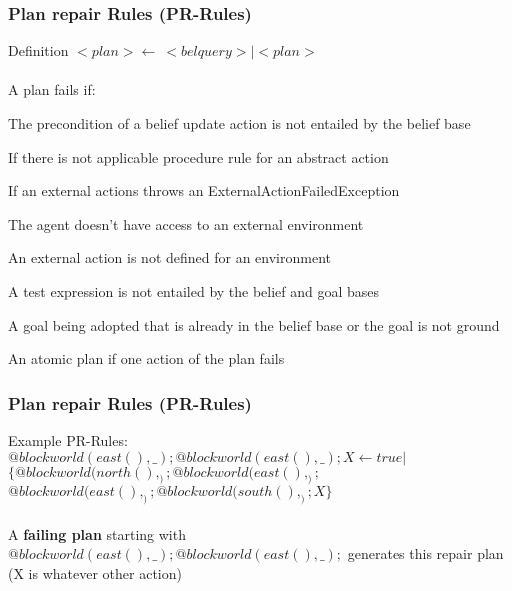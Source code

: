   \begin{frame}
    \frametitle{Plan repair Rules (PR-Rules)}
    \begin{block}{Definition}
      $<plan>\leftarrow\ <belquery> | <plan> $ \\~\\

      A plan fails if:
      \begin{itemize}{\small
        \item The precondition of a belief update action is not entailed by the belief base
        \item If there is not applicable procedure rule for an abstract action
        \item If an external actions throws an ExternalActionFailedException
        \item The agent doesn't have access to an external environment 
        \item An external action is not defined for an environment
        \item A test expression is not entailed by the belief and goal bases
        \item A goal being adopted that is already in the belief base or the goal is not ground
        \item An atomic plan if one action of the plan fails}
      \end{itemize} 
    \end{block}
  \end{frame}
  
  \begin{frame}
    \frametitle{Plan repair Rules (PR-Rules)}
    \begin{block}{Example}
      PR-Rules:\\
      \tab $@blockworld(east(),\_);@blockworld(east(),\_);X \leftarrow true | $\\
      \tab \tab $\{ @blockworld(north(),_);@blockworld(east(),_);$ \\
      \tab \tab $@blockworld(east(),_);@blockworld(south(),_);X \}$ \\~\\
      
      A \textbf{failing plan} starting with $@blockworld(east(),\_);@blockworld(east(),\_);$ generates this repair plan (X is whatever other action)
    \end{block}
  \end{frame}
  
